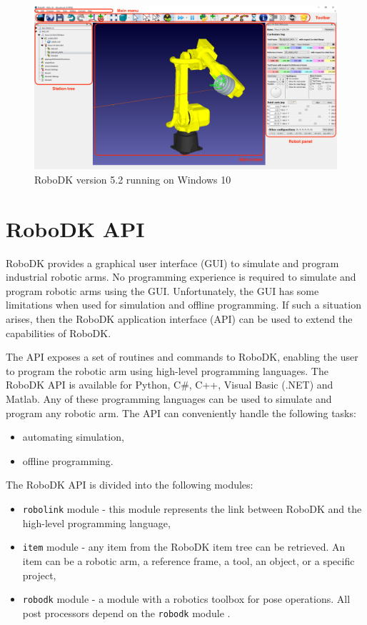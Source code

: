 \begin{figure}[h]
    \centering
    \includegraphics[width=0.9\linewidth]{img/robodk_interface_v_2.png}
    \caption{RoboDK version 5.2 running on Windows 10}
    \label{fig:robodkinterface}
\end{figure}

\section{RoboDK API}

RoboDK provides a graphical user interface (GUI) to simulate and program industrial robotic arms. No programming experience is required to simulate and program robotic arms using the GUI. Unfortunately, the GUI has some limitations when used for simulation and offline programming. If such a situation arises, then the RoboDK application interface (API) can be used to extend the capabilities of RoboDK.

The API exposes a set of routines and commands to RoboDK, enabling the user to program the robotic arm using high-level programming languages. The RoboDK API is available for Python, C\#, C++, Visual Basic (.NET) and Matlab. Any of these programming languages can be used to simulate and program any robotic arm. The API can conveniently handle the following tasks:

\begin{itemize}
    \item automating simulation,
    \item offline programming.
\end{itemize}

The RoboDK API is divided into the following modules:


\begin{itemize}
    \item \texttt{robolink} module - this module represents the link between RoboDK and the high-level programming language,
    \item \texttt{item} module - any item from the RoboDK item tree can be retrieved.  An item can be a robotic arm, a reference frame, a tool, an object, or a specific project,
    \item \texttt{robodk} module - a module with a robotics toolbox for pose operations. All post processors depend on the \texttt{robodk} module \cite{robodkapi}.
\end{itemize}

